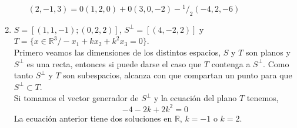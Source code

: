 \documentclass[11pt]{article}
\newcommand*\rfrac[2]{{}^{#1}\!/_{#2}} %
\begin{document}
\begin{enumerate}
\begin{enumerate}
       $ (2, -1, 3) = 0 (1,2,0) + 0 (3,0,-2) - \rfrac{1}{2} (-4,2,-6)$
      \end{enumerate}
    \item $S=[(1,1,-1);(0,2,2)]$, $S^{\perp}=[(4,-2,2)]$ y 
      $T=\{x \in \mathbb{R}^3 /-x_1+kx_2+k^2x_3=0\}$.\\
      Primero veamos las dimensiones de los distintos espacios, $S$ y $T$ son planos y 
      $S^{\perp}$ es una recta, entonces si puede darse el caso que $T$ contenga a 
      $S^{\perp}$. Como tanto $S^{\perp}$ y $T$ son subespacios, alcanza con que
      compartan un punto para que $S^{\perp} \subset T$.\\
      Si tomamos el vector generador de $S^{\perp}$ y la ecuación del plano $T$ tenemos,
      \[ -4 -2 k + 2 k^2 = 0\]
      La ecuación anterior tiene dos soluciones en $\mathbb{R}$, $k=-1$ o $k=2$.
\end{enumerate}
\end{document}
